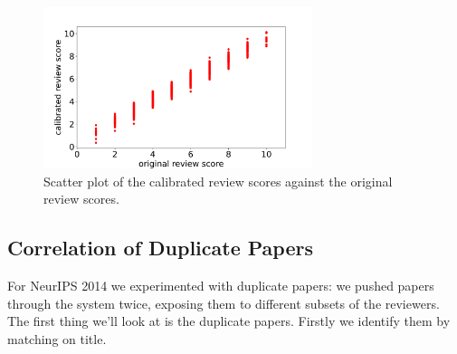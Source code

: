 \begin{figure}[htb]
\includegraphics[width=0.70\textwidth]{diagrams/neurips/calibrated-review-score-vs-original-score.pdf}


\caption{Scatter plot of the calibrated review scores against the original review scores.}
\label{calibrated-review-vs-original-score}
\end{figure}

\hypertarget{correlation-of-duplicate-papers}{%
\subsection{Correlation of Duplicate
Papers}\label{correlation-of-duplicate-papers}}

\begin{flushright}
\end{flushright}

For NeurIPS 2014 we experimented with duplicate papers: we pushed papers
through the system twice, exposing them to different subsets of the
reviewers. The first thing we'll look at is the duplicate papers.
Firstly we identify them by matching on title.

\begin{Shaded}
\begin{Highlighting}[]
\OperatorTok{=}\OperatorTok{+} 
\OperatorTok{=}\OperatorTok{=}
\OperatorTok{=}\NormalTok{ []}
     \OperatorTok{\textgreater{}}  \OperatorTok{!=} \NormalTok{:}
\OperatorTok{=} \NormalTok{(papers.papers[papers.papers[}\NormalTok{].}\NormalTok{.contains(papers.papers.Title[ID].strip())].index)}
\OperatorTok{=}\NormalTok{)}
\end{Highlighting}
\end{Shaded}

